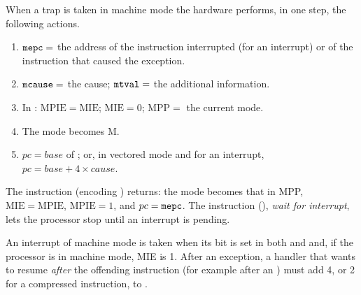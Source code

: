 When a trap is taken in machine mode the hardware performs, in one step, the
following actions.
\begin{enumerate}[nosep]
\item $\texttt{mepc}=$ the address of the instruction interrupted (for an
  interrupt) or of the instruction that caused the exception.
\item $\texttt{mcause}=$ the cause; $\texttt{mtval}=$ the additional information.
\item In : $\mathrm{MPIE}=\mathrm{MIE}$; $\mathrm{MIE}=0$;
  $\mathrm{MPP}=$ the current mode.
\item The mode becomes M.
\item $pc=\mathit{base}$ of ; or, in vectored mode and for an
  interrupt, $pc=\mathit{base}+4\times\mathit{cause}$.
\end{enumerate}
The instruction  (encoding ) returns: the mode
becomes that in MPP, $\mathrm{MIE}=\mathrm{MPIE}$, $\mathrm{MPIE}=1$, and
$pc=\texttt{mepc}$. The instruction  (), \emph{wait for
interrupt}, lets the processor stop until an interrupt is pending.

An interrupt of machine mode is taken when its bit is set in both 
and  and, if the processor is in machine mode, MIE is 1. After an
exception, a handler that wants to resume \emph{after} the offending
instruction (for example after an ) must add 4, or 2 for a
compressed instruction, to .

